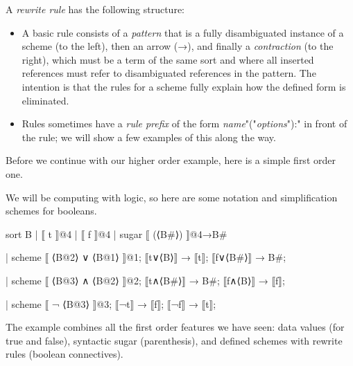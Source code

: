 \documentclass[11pt]{article} %
\begin{document}
\begin{notation}\label{nota:rule}
  A \emph{rewrite rule} has the following structure:
  \begin{itemize}

  \item A basic rule consists of a \emph{pattern} that is a fully disambiguated instance of a scheme
    (to the left), then an arrow (→), and finally a \emph{contraction} (to the right), which must be
    a term of the same sort and where all inserted references must refer to disambiguated references
    in the pattern. The intention is that the rules for a scheme fully explain how the defined form
    is eliminated.

  \item Rules sometimes have a \emph{rule prefix} of the form \emph{name}"("\emph{options}"):" in
    front of the rule; we will show a few examples of this along the way.


  \end{itemize}
\end{notation}

Before we continue with our higher order example, here is a simple first order one.

\begin{example}\label{ex:bool}
  We will be computing with logic, so here are some notation and simplification schemes for
  booleans.
\begin{code}
sort B
| ⟦ t ⟧@4 | ⟦ f ⟧@4 | sugar ⟦ (⟨B#⟩) ⟧@4→B#

| scheme ⟦ ⟨B@2⟩ ∨ ⟨B@1⟩ ⟧@1;
⟦t∨⟨B⟩⟧ → ⟦t⟧;  ⟦f∨⟨B#⟩⟧ → B#;

| scheme ⟦ ⟨B@3⟩ ∧ ⟨B@2⟩ ⟧@2;
⟦t∧⟨B#⟩⟧ → B#;  ⟦f∧⟨B⟩⟧ → ⟦f⟧;

| scheme ⟦ ¬ ⟨B@3⟩ ⟧@3;
⟦¬t⟧ → ⟦f⟧;  ⟦¬f⟧ → ⟦t⟧;
\end{code}
  The example combines all the first order features we have seen: data values (for true and false),
  syntactic sugar (parenthesis), and defined schemes with rewrite rules (boolean connectives).
\end{example}
\end{document}
